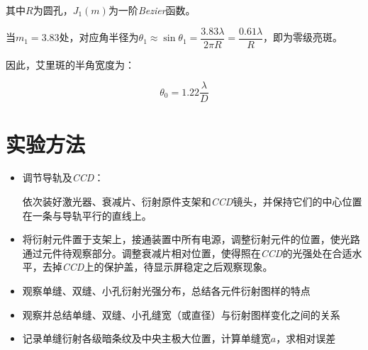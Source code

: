 \documentclass[a4paper]{ltxdoc}
\begin{document}
\begin{multicols}{2}
    其中$R$为圆孔，$J_1(m)$为一阶\textit{Bezier}函数。

    当$m_1=3.83$处，对应角半径为$\theta_1\approx\sin\theta_1=\dfrac{3.83\lambda}{2\pi R}=\dfrac{0.61\lambda}{R}$，即为零级亮斑。

    \bigskip

    因此，艾里斑的半角宽度为：

    $$
        \theta_0 = 1.22 \dfrac{\lambda}{D}
    $$

    \section{实验方法}

    \begin{itemize}
        \item 调节导轨及\textit{CCD}：

              依次装好激光器、衰减片、衍射原件支架和\textit{CCD}镜头，并保持它们的中心位置在一条与导轨平行的直线上。

        \item 将衍射元件置于支架上，接通装置中所有电源，调整衍射元件的位置，使光路通过元件待观察部分。调整衰减片相对位置，使得照在\textit{CCD}的光强处在合适水平，去掉\textit{CCD}上的保护盖，待显示屏稳定之后观察现象。

        \item 观察单缝、双缝、小孔衍射光强分布，总结各元件衍射图样的特点
        \item 观察并总结单缝、双缝、小孔缝宽（或直径）与衍射图样变化之间的关系
        \item 记录单缝衍射各级暗条纹及中央主极大位置，计算单缝宽$a$，求相对误差
    \end{itemize}
\end{multicols}
\end{document}
